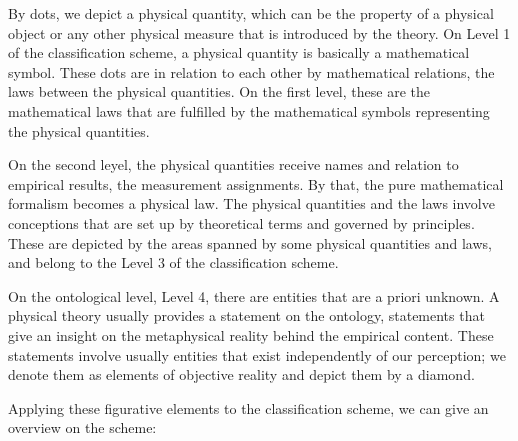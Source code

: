 \documentclass{article}
\begin{document}
By dots, we depict a physical quantity, which can be the property of a physical object or any other physical measure that is introduced by the theory. On Level 1 of the classification scheme, a physical quantity is basically a mathematical symbol. These dots are in relation to each other by mathematical relations, the laws between the physical quantities. On the first level, these are the mathematical laws that are fulfilled by the mathematical symbols representing the physical quantities. \newline

On the second leyel, the physical quantities receive names and relation to empirical results, the measurement assignments. By that, the pure mathematical formalism becomes a physical law. The physical quantities and the laws involve conceptions that are set up by theoretical terms and governed by principles. These are depicted by the areas spanned by some physical quantities and laws, and belong to the Level 3 of the classification scheme. \newline

On the ontological level, Level 4, there are entities that are a priori unknown. A physical theory usually provides a statement on the ontology, statements that give an insight on the metaphysical reality behind the empirical content. These statements involve usually entities that exist independently of our perception; we denote them as elements of objective reality and depict them by a diamond. 

\newpage

Applying these figurative elements to the classification scheme, we can give an overview on the scheme: \newline
\end{document}
